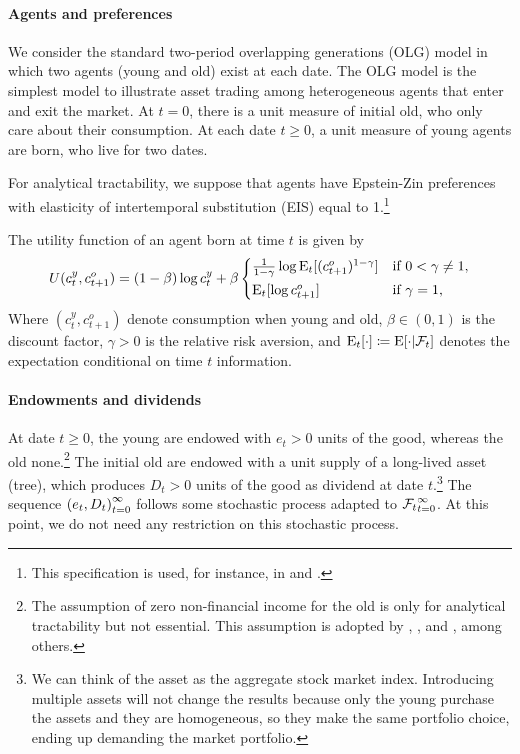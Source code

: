 \documentclass[a4paper,12pt]{article}
\newcommand{\F}{\mathcal{F}}
\numberwithin{equation}{section}
\theoremstyle{plain}
\begin{document}
\paragraph{Agents and preferences}
We consider the standard two-period overlapping generations (OLG) model in which two agents (young and old) exist at each date. The OLG model is the simplest model to illustrate asset trading among heterogeneous agents that enter and exit the market. At $t=0$, there is a unit measure of initial old, who only care about their consumption. At each date $t\ge 0$, a unit measure of young agents are born, who live for two dates.

For analytical tractability, we suppose that agents have Epstein-Zin preferences with elasticity of intertemporal substitution (EIS) equal to 1.\footnote{This specification is used, for instance, in \citet[Proposition 1]{ChackoViceira2005} and \citet[Theorem 2]{TodaWalsh2020RFS}.}

\begin{asmp}\label{asmp:utility}
The utility function of an agent born at time $t$ is given by
\begin{equation}
    U(c_t^y,c_{t+1}^o)=(1-\beta)\log c_t^y+\beta\begin{cases*}
        \frac{1}{1-\gamma}\log \E_t[(c_{t+1}^o)^{1-\gamma}] & if $0<\gamma\neq 1$,\\
        \E_t[\log c_{t+1}^o] & if $\gamma=1$,
    \end{cases*}
    \label{eq:utility}
\end{equation}
Where $(c_t^y,c_{t+1}^o)$ denote consumption when young and old, $\beta\in (0,1)$ is the discount factor, $\gamma>0$ is the relative risk aversion, and $\E_t[\cdot]\coloneqq \E[\cdot|\F_t]$ denotes the expectation conditional on time $t$ information.
\end{asmp}

\paragraph{Endowments and dividends}

At date $t\ge 0$, the young are endowed with $e_t>0$ units of the good, whereas the old none.\footnote{The assumption of zero non-financial income for the old is only for analytical tractability but not essential. This assumption is adopted by \citet{Tirole1985}, \citet*{AllenBarlevyGale2025}, and \citet{HiranoToda2025PNAS}, among others.} The initial old are endowed with a unit supply of a long-lived asset (tree), which produces $D_t>0$ units of the good as dividend at date $t$.\footnote{We can think of the asset as the aggregate stock market index. Introducing multiple assets will not change the results because only the young purchase the assets and they are homogeneous, so they make the same portfolio choice, ending up demanding the market portfolio.} The sequence $\set{(e_t,D_t)}_{t=0}^\infty$ follows some stochastic process adapted to $\set{\F_t}_{t=0}^\infty$. At this point, we do not need any restriction on this stochastic process.
\end{document}
